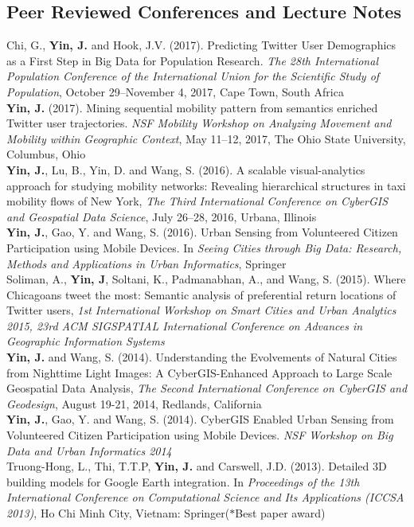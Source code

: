 \documentclass[11pt, a4paper]{article}
\newcommand{\years}[1]{\marginnote{\scriptsize #1}}
\begin{document}
\subsection*{Peer Reviewed Conferences and Lecture Notes}
\noindent
\years{2017}Chi, G., \textbf{Yin, J.} and Hook, J.V. (2017). Predicting Twitter User Demographics as a First Step in Big Data for Population Research. \textit{The 28th International Population Conference of the International Union for the Scientific Study of Population}, October 29–November 4, 2017, Cape Town, South Africa\\
\years{2017}\textbf{Yin, J.} (2017). Mining sequential mobility pattern from semantics enriched Twitter user trajectories. \textit{NSF Mobility Workshop on Analyzing Movement and Mobility within Geographic Context}, May 11–12, 2017, The Ohio State University, Columbus, Ohio\\
\years{2016}\textbf{Yin, J.}, Lu, B., Yin, D. and Wang, S. (2016). A scalable visual-analytics approach for studying mobility networks: Revealing hierarchical structures in taxi mobility flows of New York, \textit{The Third International Conference on CyberGIS and Geospatial Data Science}, July 26–28, 2016, Urbana, Illinois\\
\years{2016}\textbf{Yin, J.}, Gao, Y. and Wang, S. (2016). Urban Sensing from Volunteered Citizen Participation using Mobile Devices. In \emph{Seeing Cities through Big Data: Research, Methods and Applications in Urban Informatics}, Springer\\
\years{2015}Soliman, A., \textbf{Yin, J}, Soltani, K., Padmanabhan, A., and Wang, S. (2015). Where Chicagoans tweet the most: Semantic analysis of preferential return locations of Twitter users, \textit{1st International Workshop on Smart Cities and Urban Analytics 2015, 23rd ACM SIGSPATIAL International Conference on Advances in Geographic Information Systems}\\ 
\years{2014}\textbf{Yin, J.} and Wang, S. (2014). Understanding the Evolvements of Natural Cities from Nighttime Light Images: A CyberGIS-Enhanced Approach to Large Scale Geospatial Data Analysis, \textit{The Second International Conference on CyberGIS and Geodesign}, August 19-21, 2014, Redlands, California\\
\years{2014}\textbf{Yin, J.}, Gao, Y. and Wang, S. (2014). CyberGIS Enabled Urban Sensing from Volunteered Citizen Participation using Mobile Devices. \textit{NSF Workshop on Big Data and Urban Informatics 2014}\\
\years{2013}Truong-Hong, L., Thi, T.T.P, \textbf{Yin, J.} and Carswell, J.D. (2013). Detailed 3D building models for Google Earth integration. In \textit{Proceedings of the 13th International Conference on Computational Science and Its Applications (ICCSA 2013)}, Ho Chi Minh City, Vietnam: Springer($*$Best paper award)\\
\end{document}

